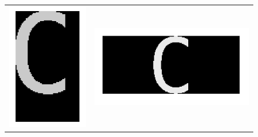 \documentclass[a4paper,12pt,titlepage]{report}
\begin{document}
	\begin{figure}[h!]
		\begin{center}	
			\begin{tabular}{cc}
			\includegraphics[scale=0.12]{../illus/tuilev.png} &
			\includegraphics[scale=0.18]{../illus/2echv.png}	\\

\end{tabular}
\end{center}
\end{figure}
\end{document}
